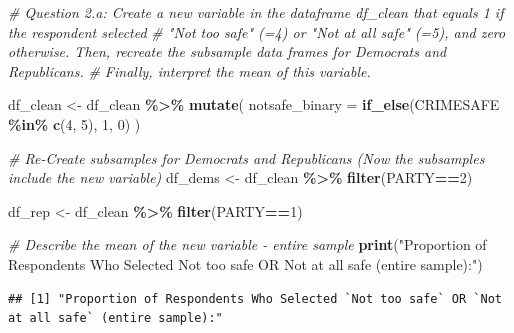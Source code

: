 \documentclass[
  11pt,
]{article}
\newenvironment{Shaded}{\begin{snugshade}}{\end{snugshade}}
\newcommand{\AttributeTok}[1]{\textcolor[rgb]{0.13,0.29,0.53}{#1}}
\newcommand{\CommentTok}[1]{\textcolor[rgb]{0.56,0.35,0.01}{\textit{#1}}}
\newcommand{\DecValTok}[1]{\textcolor[rgb]{0.00,0.00,0.81}{#1}}
\newcommand{\FunctionTok}[1]{\textcolor[rgb]{0.13,0.29,0.53}{\textbf{#1}}}
\newcommand{\NormalTok}[1]{#1}
\newcommand{\OtherTok}[1]{\textcolor[rgb]{0.56,0.35,0.01}{#1}}
\newcommand{\SpecialCharTok}[1]{\textcolor[rgb]{0.81,0.36,0.00}{\textbf{#1}}}
\newcommand{\StringTok}[1]{\textcolor[rgb]{0.31,0.60,0.02}{#1}}
\begin{document}
\begin{Shaded}
\begin{Highlighting}[]
\CommentTok{\# Question 2.a: Create a new variable in the dataframe \textasciigrave{}df\_clean\textasciigrave{} that equals 1 if the respondent selected}
\CommentTok{\# "Not too safe" (=4) or "Not at all safe" (=5), and zero otherwise. Then, recreate the subsample data frames for Democrats and Republicans.}
\CommentTok{\# Finally, interpret the mean of this variable.}

\NormalTok{df\_clean }\OtherTok{\textless{}{-}}\NormalTok{ df\_clean }\SpecialCharTok{\%\textgreater{}\%}
  \FunctionTok{mutate}\NormalTok{(}
    \AttributeTok{notsafe\_binary =} \FunctionTok{if\_else}\NormalTok{(CRIMESAFE }\SpecialCharTok{\%in\%} \FunctionTok{c}\NormalTok{(}\DecValTok{4}\NormalTok{, }\DecValTok{5}\NormalTok{), }\DecValTok{1}\NormalTok{, }\DecValTok{0}\NormalTok{)}
\NormalTok{  )}

\CommentTok{\# Re{-}Create subsamples for Democrats and Republicans (Now the subsamples include the new variable)}
\NormalTok{df\_dems }\OtherTok{\textless{}{-}}\NormalTok{ df\_clean }\SpecialCharTok{\%\textgreater{}\%}
  \FunctionTok{filter}\NormalTok{(PARTY}\SpecialCharTok{==}\DecValTok{2}\NormalTok{) }

\NormalTok{df\_rep }\OtherTok{\textless{}{-}}\NormalTok{ df\_clean }\SpecialCharTok{\%\textgreater{}\%}
  \FunctionTok{filter}\NormalTok{(PARTY}\SpecialCharTok{==}\DecValTok{1}\NormalTok{) }

\CommentTok{\# Describe the mean of the new variable {-} entire sample}
\FunctionTok{print}\NormalTok{(}\StringTok{"Proportion of Respondents Who Selected \textasciigrave{}Not too safe\textasciigrave{} OR \textasciigrave{}Not at all safe\textasciigrave{} (entire sample):"}\NormalTok{)}
\end{Highlighting}
\end{Shaded}

\begin{verbatim}
## [1] "Proportion of Respondents Who Selected `Not too safe` OR `Not at all safe` (entire sample):"
\end{verbatim}

\begin{Shaded}
\end{Shaded}
\end{document}
